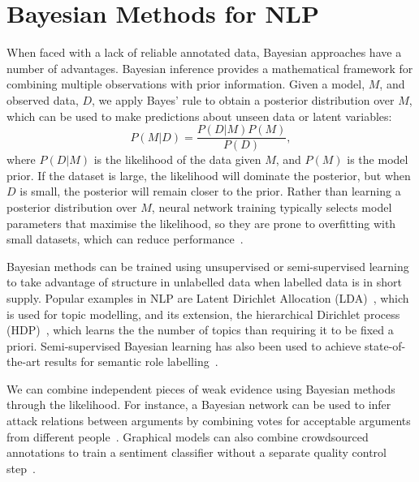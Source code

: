 \section{Bayesian Methods for NLP}\label{sec:bayesian}

When faced with a lack of reliable annotated data, 
Bayesian approaches have a number of advantages.
Bayesian inference provides a mathematical framework for combining multiple observations
with prior information. 
Given a model, $M$, and observed data, $D$, we apply Bayes' rule
to obtain a posterior distribution over $M$, which can be used to make predictions 
about unseen data or latent variables:
\begin{equation}
  P(M|D) = \frac{P(D|M)P(M)}{P(D)},
  \label{eq:bayesrule}
\end{equation}
where $P(D|M)$ is the likelihood of the data given $M$, and $P(M)$ is the model prior.
If the dataset is large, the likelihood will dominate the posterior,
but when $D$ is small, the posterior will remain closer to the prior.
Rather than learning a posterior distribution over $M$,
neural network training typically selects model parameters that maximise the likelihood, 
so they are prone to overfitting with small datasets, which can reduce performance~\cite{xiong2011bayesian}.

Bayesian methods can be trained using unsupervised or semi-supervised learning
to take advantage of structure in unlabelled data when labelled data is in short supply.
Popular examples in NLP are
Latent Dirichlet Allocation (LDA)~\cite{blei2003latent}, which is used for topic modelling,
and its extension, the hierarchical Dirichlet process (HDP)~\cite{teh2005sharing}, which learns the 
the number of topics than requiring it to be fixed a priori.
Semi-supervised Bayesian learning
has also been used to achieve state-of-the-art results for semantic role labelling~\cite{titov2012bayesian}.

We can combine independent pieces of weak evidence using Bayesian methods through the likelihood.
For instance, a Bayesian network can be used to infer attack relations between arguments by combining votes for acceptable arguments from different people~\cite{kido2017}.
Graphical models can also combine crowdsourced annotations to train a sentiment classifier
without a separate quality control step~\cite{simpson2015language,felt2016semantic}.

